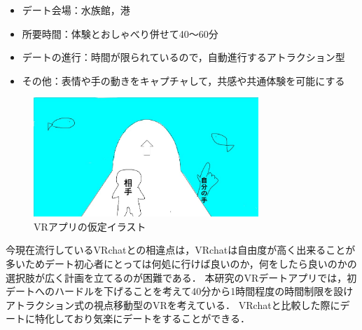 \documentclass[12pt]{ltjsarticle}
\begin{document}
\begin{itemize}
\item デート会場：水族館，港
\item 所要時間：体験とおしゃべり併せて40〜60分
\item デートの進行：時間が限られているので，自動進行するアトラクション型
\item その他：表情や手の動きをキャプチャして，共感や共通体験を可能にする
\end{itemize}





\begin{figure}[h]
\begin{center}
 \includegraphics[width=85mm]{irasuto.jpg}
\end{center}
 \caption{VRアプリの仮定イラスト}
 \label{fig:イラスト}
\end{figure}


今現在流行しているVRchatとの相違点は，VRchatは自由度が高く出来ることが多いためデート初心者にとっては何処に行けば良いのか，何をしたら良いのかの選択肢が広く計画を立てるのが困難である．
本研究のVRデートアプリでは，初デートへのハードルを下げることを考えて40分から1時間程度の時間制限を設けアトラクション式の視点移動型のVRを考えている．
VRchatと比較した際にデートに特化しており気楽にデートをすることができる．
\end{document}
